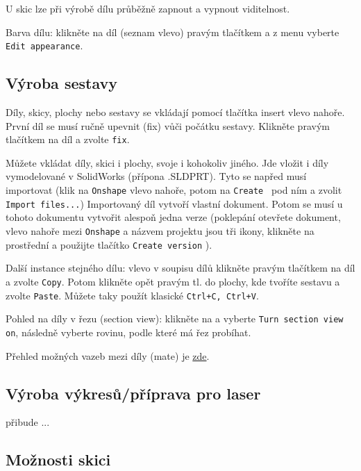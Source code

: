 U skic lze při výrobě dílu průběžně zapnout a vypnout viditelnost.

Barva dílu: klikněte na díl (seznam vlevo) pravým tlačítkem a  z menu vyberte {\tt Edit appearance}. 

\subsection{Výroba sestavy} \label{sestava:vyroba}

Díly, skicy, plochy nebo sestavy se vkládají pomocí tlačítka insert vlevo nahoře. 
První díl se musí ručně upevnit (fix) vůči počátku sestavy. Klikněte pravým tlačítkem na díl a zvolte {\tt fix}. 

Můžete vkládat díly, skici i plochy, svoje i kohokoliv jiného. 
Jde vložit i díly vymodelované v SolidWorks (přípona .SLDPRT). 
Tyto se napřed musí importovat (klik na {\tt Onshape} vlevo nahoře, potom na {\tt Create } pod ním a zvolit {\tt Import files...}) 
Importovaný díl vytvoří vlastní dokument. Potom se musí u tohoto dokumentu vytvořit alespoň jedna verze (poklepání otevřete dokument, vlevo nahoře mezi {\tt Onshape} 
a názvem projektu jsou tři ikony, klikněte na prostřední a použijte tlačítko {\tt Create version} ). 

Další instance stejného dílu: vlevo v soupisu dílů klikněte pravým tlačítkem na díl a zvolte {\tt Copy}. 
Potom klikněte opět pravým tl. do plochy, kde tvoříte sestavu a zvolte {\tt Paste}. Můžete taky použít klasické {\tt Ctrl+C, Ctrl+V}. 

Pohled na díly v řezu (section view): klikněte na  a vyberte {\tt Turn section view on}, následně vyberte rovinu, podle které má řez probíhat. 

Přehled možných vazeb mezi díly (mate) je \href{https://cad.onshape.com/help/Content/mate.htm?TocPath=Desktop%20Help|Assemblies|Mates|_____0}{zde}.


\subsection{Výroba výkresů/příprava pro laser} \label{laser:vykresy}


 přibude ... 




\subsection{Možnosti skici} \label{skica:možnosti}


